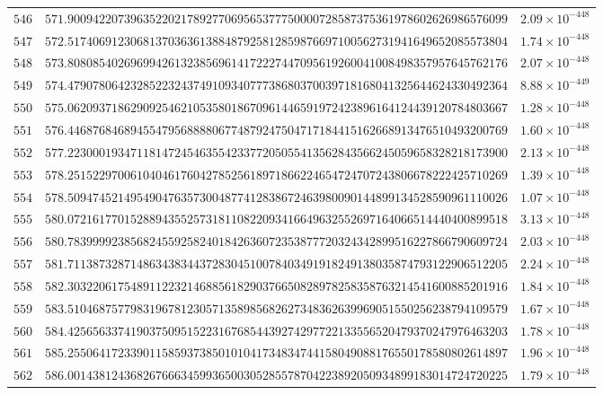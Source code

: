 \documentclass[12pt,reqno]{amsart}
\theoremstyle{remark}
\begin{document}
\begin{longtable}{clc}
$546$ & $571.9009422073963522021789277069565377750000728587375361978602626986576099$ & $2.09\times 10^{-448}$ \\
$547$ & $572.5174069123068137036361388487925812859876697100562731941649652085573804$ & $1.74\times 10^{-448}$ \\
$548$ & $573.8080854026969942613238569614172227447095619260041008498357957645762176$ & $2.07\times 10^{-448}$ \\
$549$ & $574.4790780642328522324374910934077738680370039718168041325644624330492364$ & $8.88\times 10^{-449}$ \\
$550$ & $575.0620937186290925462105358018670961446591972423896164124439120784803667$ & $1.28\times 10^{-448}$ \\
$551$ & $576.4468768468945547956888806774879247504717184415162668913476510493200769$ & $1.60\times 10^{-448}$ \\
$552$ & $577.2230001934711814724546355423377205055413562843566245059658328218173900$ & $2.13\times 10^{-448}$ \\
$553$ & $578.2515229700610404617604278525618971866224654724707243806678222425710269$ & $1.39\times 10^{-448}$ \\
$554$ & $578.5094745214954904763573004877412838672463980090144899134528590961110026$ & $1.07\times 10^{-448}$ \\
$555$ & $580.0721617701528894355257318110822093416649632552697164066514440400899518$ & $3.13\times 10^{-448}$ \\
$556$ & $580.7839999238568245592582401842636072353877720324342899516227866790609724$ & $2.03\times 10^{-448}$ \\
$557$ & $581.7113873287148634383443728304510078403491918249138035874793122906512205$ & $2.24\times 10^{-448}$ \\
$558$ & $582.3032206175489112232146885618290376650828978258358763214541600885201916$ & $1.84\times 10^{-448}$ \\
$559$ & $583.5104687577983196781230571358985682627348362639969051550256238794109579$ & $1.67\times 10^{-448}$ \\
$560$ & $584.4256563374190375095152231676854439274297722133556520479370247976463203$ & $1.78\times 10^{-448}$ \\
$561$ & $585.2550641723390115859373850101041734834744158049088176550178580802614897$ & $1.96\times 10^{-448}$ \\
$562$ & $586.0014381243682676663459936500305285578704223892050934899183014724720225$ & $1.79\times 10^{-448}$ \\

\end{longtable}
\end{document}
